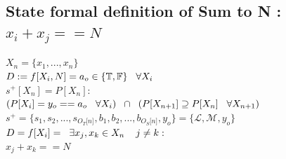\documentclass[11pt]{article}
\begin{document}
\subsection{State formal definition of Sum to N : $x_i + x_j == N$}
\begin{center}
\vspace{1.5mm}
$
X_n= \{x_1,...,x_n\}
$
\\ \vspace{6mm}
$
D := f \lbrack X_i,N \rbrack = a_{o} \in \{\mathbb{T}, \mathbb{F}\} \hspace{3mm} \forall X_i
$
\\ \vspace{6mm}
$
s^+[X_n]= P[X_n] :
$
\\ \vspace{2mm}
$
(P \lbrack X_i \rbrack = y_{o} == a_{o} \hspace{3mm} \forall X_i) \hspace{2mm} \cap \hspace{2mm} (P[{X}_{n+1}] \supseteq P[X_n] \hspace{3mm} \forall X_{n+1})
$
\\ \vspace{6mm}
$
s^+ = \{ s_1,s_2,...,s_{O_T \lbrack n \rbrack }, b_1, b_2,...,b_{O_S \lbrack n \rbrack},y_o \} = \{ \mathcal{L},\mathcal{M},y_o\}
$
\\ \vspace{6mm}
$
D = f[X_i] = \hspace{2mm} \exists x_j,x_k \in X_n \hspace{4mm} j\neq k: 
$
\\ \vspace{2mm}
$
x_j + x_k == N
$
\end{center}
\end{document}
